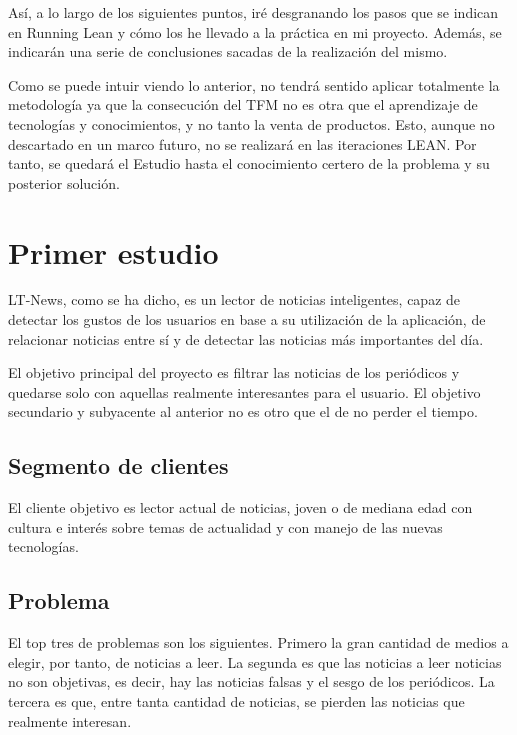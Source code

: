 Así, a lo largo de los siguientes puntos, iré desgranando los pasos que se indican en Running Lean y cómo los he llevado a la práctica en mi proyecto. Además, se indicarán una serie de conclusiones sacadas de la realización del mismo.

Como se puede intuir viendo lo anterior, no tendrá sentido aplicar totalmente la metodología ya que la consecución del TFM no es otra que el aprendizaje de tecnologías y conocimientos, y no tanto la venta de productos. Esto, aunque no descartado en un marco futuro, no se realizará en las iteraciones LEAN. Por tanto, se quedará el Estudio hasta el conocimiento certero de la problema y su posterior solución.


\section{Primer estudio}\label{sec:primer_estudio}

LT-News, como se ha dicho, es un lector de noticias inteligentes, capaz de detectar los gustos de los usuarios en base a su utilización de la aplicación, de relacionar noticias entre sí y de detectar las noticias más importantes del día.

El objetivo principal del proyecto es filtrar las noticias de los periódicos y quedarse solo con aquellas realmente interesantes para el usuario. El objetivo secundario y subyacente al anterior no es otro que el de no perder el tiempo.


\subsection{Segmento de clientes}
El cliente objetivo es lector actual de noticias, joven o de mediana edad con cultura e interés sobre temas de actualidad y con manejo de las nuevas tecnologías. 

\subsection{Problema}
El top tres de problemas son los siguientes. Primero la gran cantidad de medios a elegir, por tanto, de noticias a leer. La segunda es que las noticias a leer noticias no son objetivas, es decir, hay las noticias falsas y el sesgo de los periódicos. La tercera es que, entre tanta cantidad de noticias, se pierden las noticias que realmente interesan.

